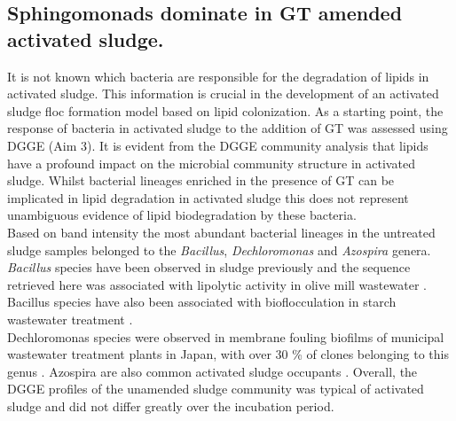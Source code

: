 \documentclass[twoside]{article}
\begin{document}
\subsection{Sphingomonads dominate in GT amended activated sludge.}
It is not known which bacteria are responsible for the degradation of lipids in activated sludge. This information is crucial in the development of an activated sludge floc formation model based on lipid colonization. As a starting point, the response of bacteria in activated sludge to the addition of GT was assessed using DGGE (Aim 3). It is evident from the DGGE community analysis that lipids have a profound impact on the microbial community structure in activated sludge. Whilst bacterial lineages enriched in the presence of GT can be implicated in lipid degradation in activated sludge this does not represent unambiguous evidence of lipid biodegradation by these bacteria.\\

Based on band intensity the most abundant bacterial lineages in the untreated sludge samples belonged to the \emph{Bacillus}, \emph{Dechloromonas} and \emph{Azospira} genera. \emph{Bacillus} species have been observed in sludge previously and the sequence retrieved here was associated with lipolytic activity in olive mill wastewater \cite{ertuugrul2007isolation}. Bacillus species have also been associated with bioflocculation in starch wastewater treatment \cite{deng2003characteristics}.\\

Dechloromonas species were observed in membrane fouling biofilms of municipal wastewater treatment plants in Japan, with over 30 \% of clones belonging to this genus \cite{miura2007membrane}. Azospira are also common activated sludge occupants \cite{tan2003dechlorosoma,reinhold2000reassessment,hunter2007azospira,wilhelmus2013microbiological}.
Overall, the DGGE profiles of the unamended sludge community was typical of activated sludge and did not differ greatly over the incubation period.\\
\end{document}
